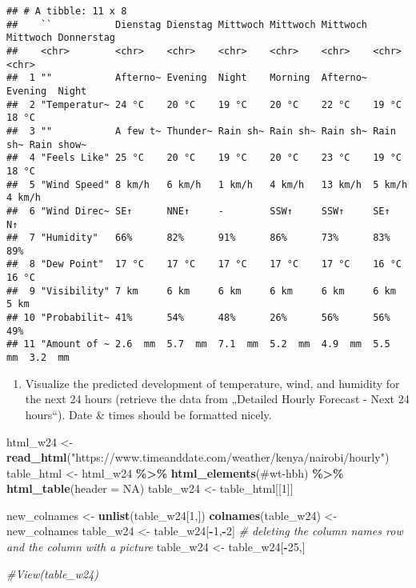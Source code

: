 \documentclass[
]{article}
\newenvironment{Shaded}{\begin{snugshade}}{\end{snugshade}}
\newcommand{\AttributeTok}[1]{\textcolor[rgb]{0.13,0.29,0.53}{#1}}
\newcommand{\CommentTok}[1]{\textcolor[rgb]{0.56,0.35,0.01}{\textit{#1}}}
\newcommand{\ConstantTok}[1]{\textcolor[rgb]{0.56,0.35,0.01}{#1}}
\newcommand{\DecValTok}[1]{\textcolor[rgb]{0.00,0.00,0.81}{#1}}
\newcommand{\FunctionTok}[1]{\textcolor[rgb]{0.13,0.29,0.53}{\textbf{#1}}}
\newcommand{\NormalTok}[1]{#1}
\newcommand{\OtherTok}[1]{\textcolor[rgb]{0.56,0.35,0.01}{#1}}
\newcommand{\SpecialCharTok}[1]{\textcolor[rgb]{0.81,0.36,0.00}{\textbf{#1}}}
\newcommand{\StringTok}[1]{\textcolor[rgb]{0.31,0.60,0.02}{#1}}
\providecommand{\tightlist}{%
  \setlength{\itemsep}{0pt}\setlength{\parskip}{0pt}}
\begin{document}
\begin{verbatim}
## # A tibble: 11 x 8
##    ``           Dienstag Dienstag Mittwoch Mittwoch Mittwoch Mittwoch Donnerstag
##    <chr>        <chr>    <chr>    <chr>    <chr>    <chr>    <chr>    <chr>     
##  1 ""           Afterno~ Evening  Night    Morning  Afterno~ Evening  Night     
##  2 "Temperatur~ 24 °C    20 °C    19 °C    20 °C    22 °C    19 °C    18 °C     
##  3 ""           A few t~ Thunder~ Rain sh~ Rain sh~ Rain sh~ Rain sh~ Rain show~
##  4 "Feels Like" 25 °C    20 °C    19 °C    20 °C    23 °C    19 °C    18 °C     
##  5 "Wind Speed" 8 km/h   6 km/h   1 km/h   4 km/h   13 km/h  5 km/h   4 km/h    
##  6 "Wind Direc~ SE↑      NNE↑     -        SSW↑     SSW↑     SE↑      N↑        
##  7 "Humidity"   66%      82%      91%      86%      73%      83%      89%       
##  8 "Dew Point"  17 °C    17 °C    17 °C    17 °C    17 °C    16 °C    16 °C     
##  9 "Visibility" 7 km     6 km     6 km     6 km     6 km     6 km     5 km      
## 10 "Probabilit~ 41%      54%      48%      26%      56%      56%      49%       
## 11 "Amount of ~ 2.6  mm  5.7  mm  7.1  mm  5.2  mm  4.9  mm  5.5  mm  3.2  mm
\end{verbatim}

\begin{enumerate}
\def\labelenumi{\alph{enumi})}
\setcounter{enumi}{1}
\tightlist
\item
  Visualize the predicted development of temperature, wind, and humidity
  for the next 24 hours (retrieve the data from „Detailed Hourly
  Forecast - Next 24 hours``). Date \& times should be formatted nicely.
\end{enumerate}

\begin{Shaded}
\begin{Highlighting}[]
\NormalTok{html\_w24 }\OtherTok{\textless{}{-}} \FunctionTok{read\_html}\NormalTok{(}\StringTok{"https://www.timeanddate.com/weather/kenya/nairobi/hourly"}\NormalTok{)}
\NormalTok{table\_html }\OtherTok{\textless{}{-}}\NormalTok{ html\_w24 }\SpecialCharTok{\%\textgreater{}\%} \FunctionTok{html\_elements}\NormalTok{(}\StringTok{\textquotesingle{}\#wt{-}hbh\textquotesingle{}}\NormalTok{) }\SpecialCharTok{\%\textgreater{}\%} \FunctionTok{html\_table}\NormalTok{(}\AttributeTok{header =} \ConstantTok{NA}\NormalTok{)}
\NormalTok{table\_w24 }\OtherTok{\textless{}{-}}\NormalTok{ table\_html[[}\DecValTok{1}\NormalTok{]]}

\NormalTok{new\_colnames }\OtherTok{\textless{}{-}} \FunctionTok{unlist}\NormalTok{(table\_w24[}\DecValTok{1}\NormalTok{,])}
\FunctionTok{colnames}\NormalTok{(table\_w24) }\OtherTok{\textless{}{-}}\NormalTok{ new\_colnames}
\NormalTok{table\_w24 }\OtherTok{\textless{}{-}}\NormalTok{ table\_w24[}\SpecialCharTok{{-}}\DecValTok{1}\NormalTok{,}\SpecialCharTok{{-}}\DecValTok{2}\NormalTok{] }\CommentTok{\# deleting the column names row and the column with a picture}
\NormalTok{table\_w24 }\OtherTok{\textless{}{-}}\NormalTok{ table\_w24[}\SpecialCharTok{{-}}\DecValTok{25}\NormalTok{,]}

\CommentTok{\#View(table\_w24)}
\end{Highlighting}
\end{Shaded}
\end{document}
